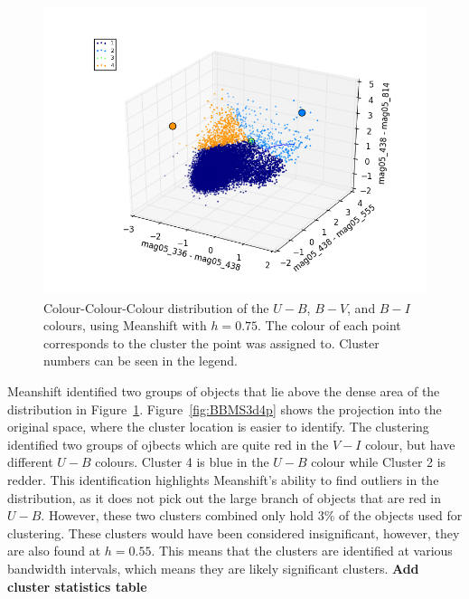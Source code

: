 \begin{figure}[H]
\centering
\includegraphics[width=\linewidth]{figs/broad/meanshift_3d_4cl_mag05_336-mag05_438vsmag05_438-mag05_555vsmag05_438-mag05_814}
\caption{Colour-Colour-Colour distribution of the $U - B$, $B - V$, and $B - I$ colours, using Meanshift with $h=0.75$. The colour of each point corresponds to the cluster the point was assigned to. Cluster numbers can be seen in the legend.}
\label{fig:BB3dMS4}
\end{figure}

Meanshift identified two groups of objects that lie above the dense area of the distribution in Figure~\ref{fig:BB3dMS4}.
Figure~\ref{fig:BBMS3d4p} shows the projection into the original space, where the cluster location is easier to identify.
The clustering identified two groups of ojbects which are quite red in the $V - I$ colour, but have different $U - B$ colours. 
Cluster 4 is blue in the $U - B$ colour while Cluster 2 is redder.
This identification highlights Meanshift's ability to find outliers in the distribution, as it does not pick out the large branch of objects that are red in $U - B$.
However, these two clusters combined only hold 3\% of the objects used for clustering.
These clusters would have been considered insignificant, however, they are also found at $h = 0.55$.
This means that the clusters are identified at various bandwidth intervals, which means they are likely significant clusters. 
\textbf{Add cluster statistics table}

